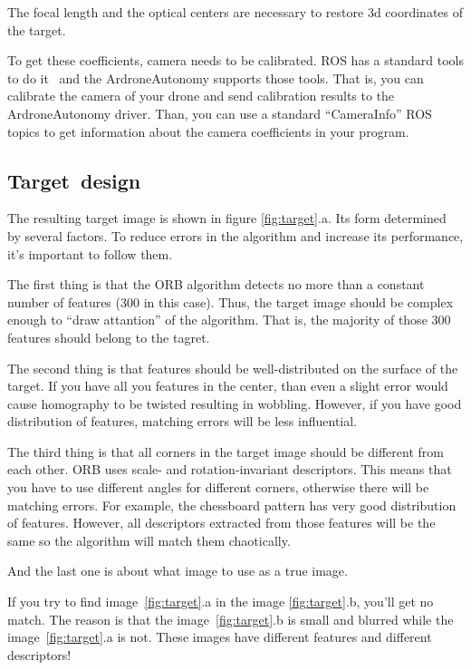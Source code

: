 \documentclass[12pt]{article}
\begin{document}
    The focal length and the optical centers are necessary to
    restore 3d coordinates of the target.

    To get these coefficients, camera needs to be calibrated.
    ROS has a standard tools to do it~\cite{ROSCamCalib} and
    the ArdroneAutonomy supports those tools. That is, you can calibrate the
    camera of your drone and send calibration results to the ArdroneAutonomy driver.
    Than, you can use a standard ``CameraInfo'' ROS topics to get information
    about the camera coefficients in your program.

    \subsection{Target~design}

    The resulting target image is shown in figure \ref{fig:target}.a.
    Its form determined by several factors.
    To reduce errors in the algorithm and increase its performance,
    it's important to follow them.

    The first thing is that the ORB algorithm detects no more than
    a constant number of features
    (300 in this case). Thus, the target image should be complex enough
    to ``draw attantion'' of the algorithm. That is, the majority
    of those 300 features should belong to the tagret.

    The second thing is that features should be well-distributed on the surface
    of the target. If you have all you features in the center, than even
    a slight error would cause homography to be twisted resulting in wobbling.
    However, if you have good distribution of features, matching
    errors will be less influential.

    The third thing is that all corners in the target image should be different
    from each other. ORB uses scale- and rotation-invariant descriptors.
    This means that you have to use different angles for different corners,
    otherwise there will be matching errors. For example, the chessboard
    pattern has very good distribution of features. However, all descriptors
    extracted from those features will be the same so the algorithm will match
    them chaotically.

    And the last one is about what image to use as a true image.

    If you try to find image~\ref{fig:target}.a
    in the image \ref{fig:target}.b, you'll get no match.
    The reason is that the image~\ref{fig:target}.b is small and blurred
    while the image~\ref{fig:target}.a is not. These images have different
    features and different descriptors!
\end{document}
